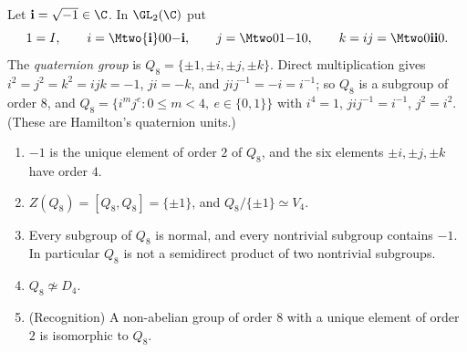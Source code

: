 \begin{definition}\label{def:groups:quaternion}
Let $\mathbf i=\sqrt{-1}\in\C$. In $\GL_2(\C)$ put
\[
1=I,\qquad i=\Mtwo{\mathbf i}00{-\mathbf i},\qquad j=\Mtwo01{-1}0,\qquad k=ij=\Mtwo0{\mathbf i}{\mathbf i}0 .
\]
The \emph{quaternion group} is $Q_8=\{\pm1,\pm i,\pm j,\pm k\}$. Direct multiplication gives $i^2=j^2=k^2=ijk=-1$, $ji=-k$, and
$jij^{-1}=-i=i^{-1}$; so $Q_8$ is a subgroup of order $8$, and $Q_8=\{i^mj^e:0\le m<4,\ e\in\{0,1\}\}$ with $i^4=1$, $jij^{-1}=i^{-1}$, $j^2=i^2$.
(These are Hamilton's quaternion units.)
\end{definition}

\begin{proposition}\label{prop:groups:quaternion}
\begin{enumerate}[label=(\roman*)]
\item $-1$ is the unique element of order $2$ of $Q_8$, and the six elements $\pm i,\pm j,\pm k$ have order $4$.
\item $Z(Q_8)=[Q_8,Q_8]=\{\pm1\}$, and $Q_8/\{\pm1\}\simeq V_4$.
\item Every subgroup of $Q_8$ is normal, and every nontrivial subgroup contains $-1$. In particular $Q_8$ is not a semidirect product of two
nontrivial subgroups.
\item $Q_8\not\simeq D_4$.
\item (Recognition) A non-abelian group of order $8$ with a unique element of order $2$ is isomorphic to $Q_8$.
\end{enumerate}
\end{proposition}

